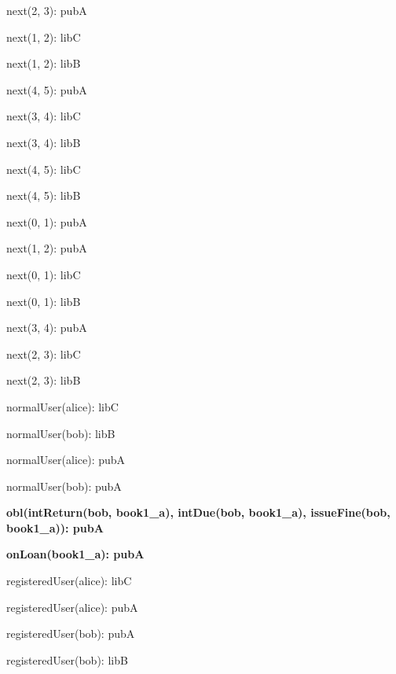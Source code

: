 \documentclass{article}
\newenvironment{states}
        {\begin{minipage}{\tableWidth}\raggedright\begin{description}[align=left,leftmargin=1em,noitemsep,labelsep=\parindent]}
        {\end{description}\end{minipage}}
\begin{document}
{\begin{states}
\item{{next(\allowbreak{}2, 3): pubA}}
\item{{next(\allowbreak{}1, 2): libC}}
\item{{next(\allowbreak{}1, 2): libB}}
\item{{next(\allowbreak{}4, 5): pubA}}
\item{{next(\allowbreak{}3, 4): libC}}
\item{{next(\allowbreak{}3, 4): libB}}
\item{{next(\allowbreak{}4, 5): libC}}
\item{{next(\allowbreak{}4, 5): libB}}
\item{{next(\allowbreak{}0, 1): pubA}}
\item{{next(\allowbreak{}1, 2): pubA}}
\item{{next(\allowbreak{}0, 1): libC}}
\item{{next(\allowbreak{}0, 1): libB}}
\item{{next(\allowbreak{}3, 4): pubA}}
\item{{next(\allowbreak{}2, 3): libC}}
\item{{next(\allowbreak{}2, 3): libB}}
\item{{normalUser(\allowbreak{}alice): libC}}
\item{{normalUser(\allowbreak{}bob): libB}}
\item{{normalUser(\allowbreak{}alice): pubA}}
\item{{normalUser(\allowbreak{}bob): pubA}}
\item\textbf{{obl(\allowbreak{}intReturn(\allowbreak{}bob, book1\_a), intDue(\allowbreak{}bob, book1\_a), issueFine(\allowbreak{}bob, book1\_a)): pubA}}
\item\textbf{{onLoan(\allowbreak{}book1\_a): pubA}}
\item{{registeredUser(\allowbreak{}alice): libC}}
\item{{registeredUser(\allowbreak{}alice): pubA}}
\item{{registeredUser(\allowbreak{}bob): pubA}}
\item{{registeredUser(\allowbreak{}bob): libB}}
\end{states}}
\end{document}
